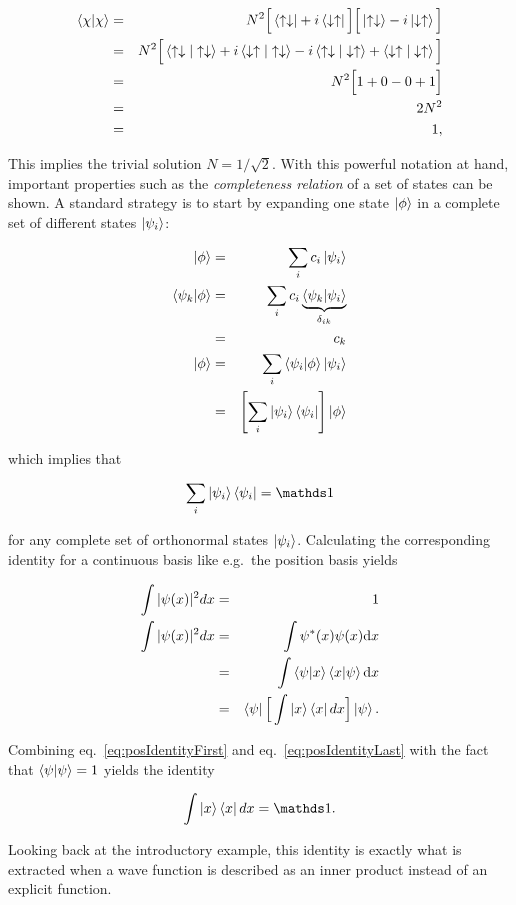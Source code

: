 \begin{eqnarray*}
 \left\langle \chi | \chi\right\rangle &=& N^2\Big[\left< \uparrow\downarrow \right| +i\left< \downarrow\uparrow \right|\Big]\Big[\left| \uparrow\downarrow \right> -i\left| \downarrow\uparrow \right>\Big] \\
 &=& N^2\Big[\left\langle \uparrow\downarrow | \uparrow\downarrow\right\rangle + i\left\langle \downarrow\uparrow | \uparrow\downarrow\right\rangle - i\left\langle \uparrow\downarrow | \downarrow\uparrow\right\rangle + \left\langle \downarrow\uparrow | \downarrow\uparrow\right\rangle\Big] \\
 &=& N^2\Big[1 + 0 - 0 + 1\Big] \\
 &=& 2N^2\\
 &=& 1,
\end{eqnarray*}

This implies the trivial solution $N=1/\sqrt{2}$. With this powerful notation at hand, important properties such as the \textit{completeness relation} of a set of states can be shown. A standard strategy is to start by expanding one state $\left| \phi \right>$ in a complete set of different states $\left| \psi_i \right>$:

\begin{eqnarray*}
 \left| \phi \right>            &=& \displaystyle\sum_i c_i\left| \psi_i \right>\\
 \left\langle \psi_k | \phi\right\rangle &=& \displaystyle\sum_i c_i\underbrace{\left\langle \psi_k | \psi_i\right\rangle}_{\delta_{ik}}\\
                       &=& c_k\\
 \left| \phi \right>            &=& \displaystyle\sum_i \left\langle \psi_i | \phi\right\rangle\left| \psi_i \right>\\
                       &=& \left[\displaystyle\sum_i \left| \psi_i \right>\left< \psi_i \right|\right]\left| \phi \right> 
\end{eqnarray*}

which implies that

\begin{equation}
 \displaystyle\sum_i \ket{\psi_i}\bra{\psi_i} = \I
 \label{eq:Completeness}
\end{equation}

for any complete set of orthonormal states $\left| \psi_i \right>$. Calculating the corresponding identity for a continuous basis like e.g.~the position basis yields

\begin{eqnarray}
 \int |\psi(x)|^2dx    &=& 1 \label{eq:posIdentityFirst} \\
 \int |\psi(x)|^2dx    &=& \int \psi^\ast(x)\psi(x)\mathrm{d}x \nonumber \\
                       &=& \int \left\langle \psi | x\right\rangle\left\langle x | \psi\right\rangle\mathrm{d}x \nonumber \\
                       &=& \left< \psi \right|\Big[\int \left| x \right>\left< x \right|dx\Big]\left| \psi \right> \label{eq:posIdentityLast}.
\end{eqnarray}

Combining eq.~\ref{eq:posIdentityFirst} and eq.~\ref{eq:posIdentityLast} with the fact that $\left\langle \psi | \psi\right\rangle = 1$ yields the identity

\begin{equation}
 \int \ket{x}\bra{x}dx = \I.
 \label{eq:CompletenessCont}
\end{equation}

Looking back at the introductory example, this identity is exactly what is extracted when a wave function is described as an inner product instead of an explicit function.
